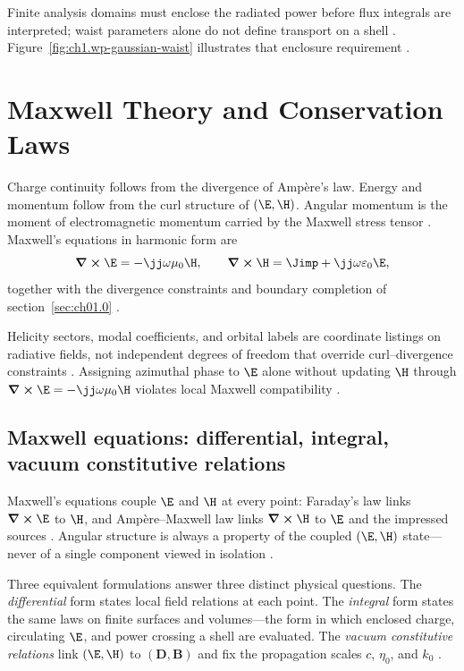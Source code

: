 Finite analysis domains must enclose the radiated power before flux integrals are interpreted; waist parameters alone do not define transport on a shell \cite{allen1992,stratton1941}. Figure~\ref{fig:ch1.wp-gaussian-waist} illustrates that enclosure requirement \cite{stratton1941}.

\section{Maxwell Theory and Conservation Laws}
\label{sec:ch01.1}

Charge continuity follows from the divergence of Amp\`ere's law. Energy and momentum
follow from the curl structure of $(\E,\H)$. Angular momentum is the moment of
electromagnetic momentum carried by the Maxwell stress tensor
\cite{maxwell1873,poynting1884,beth1936}. Maxwell's equations in harmonic form are
\begin{equation}
\label{eq:ch1.maxwell-centre}
\curl \E=-\jj\omega\mu_0\H,\qquad
\curl \H=\Jimp+\jj\omega\varepsilon_0\E,
\end{equation}
together with the divergence constraints and boundary completion of section~\ref{sec:ch01.0} \cite{stratton1941}.

Helicity sectors, modal coefficients, and orbital labels are coordinate listings on radiative fields, not independent degrees of freedom that override curl--divergence constraints \cite{maxwell1873,jackson1999}. Assigning azimuthal phase to $\E$ alone without updating $\H$ through $\curl\E=-\jj\omega\mu_0\H$ violates local Maxwell compatibility \cite{stratton1941}.

\subsection{Maxwell equations: differential, integral, vacuum constitutive relations}
\label{sec:ch01.1.1}

Maxwell's equations couple $\E$ and $\H$ at every point: Faraday's law links $\curl\E$ to $\H$, and Amp\`ere--Maxwell law links $\curl\H$ to $\E$ and the impressed sources \cite{maxwell1873,stratton1941}. Angular structure is always a property of the coupled $(\E,\H)$ state---never of a single component viewed in isolation \cite{stratton1941}.

Three equivalent formulations answer three distinct physical questions. The \emph{differential} form states local field relations at each point. The \emph{integral} form states the same laws on finite surfaces and volumes---the form in which enclosed charge, circulating $\E$, and power crossing a shell are evaluated. The \emph{vacuum constitutive relations} link $(\E,\H)$ to $(\mathbf{D},\mathbf{B})$ and fix the propagation scales $c$, $\eta_0$, and $k_0$ \cite{stratton1941}.

